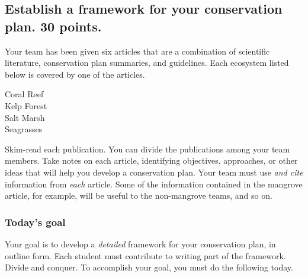 \documentclass[12pt, hidelinks]{exam}
\begin{document}
\subsection*{Establish a framework for your conservation plan. 30 points.}

Your team has been given six articles that are a combination of scientific literature, conservation plan summaries, and guidelines.  Each ecosystem listed below is covered by one of the articles.

\begin{multicols}{2}

Coral Reef\\ 
Kelp Forest\\ 
Salt Marsh\\
Seagrasses

\end{multicols}

Skim-read each publication. You can divide the publications among your team members. Take notes on each article, identifying objectives, approaches, or other ideas that will help you develop a conservation plan. Your team must use \emph{and cite} information from \emph{each} article. Some of the information contained in the mangrove article, for example, will be useful to the non-mangrove teams, and so on. 

\subsubsection*{Today's goal}

Your goal is to develop a \emph{detailed} framework for your conservation plan, in outline form. Each student must contribute to writing part of the framework. Divide and conquer. To accomplish your goal, you must do the following today.
\end{document}
